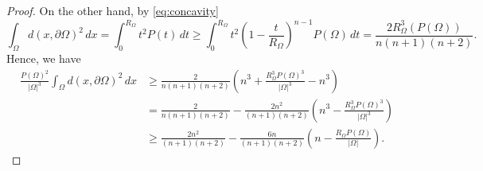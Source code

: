 \documentclass[10pt,a4paper]{amsart}
\newcommand{\abs}[1]{{\left|#1\right|}}
\begin{document}
\begin{proof}
On the other hand, by \eqref{eq:concavity}
$$\int_{\Omega} d(x,\partial\Omega)^2\, dx = \int_{0}^{R_\Omega} t^2 P(t)\, dt \geq \int_{0}^{R_\Omega} t^2 \left(1- \frac{t}{R_\Omega}\right)^{n-1}P(\Omega)\, dt = \frac{2R_{\Omega}^3(P(\Omega))}{n(n+1)(n+2)}.$$
Hence, we have
\begin{equation*}
\begin{aligned}
    \frac{P(\Omega)^2}{\abs{\Omega}^3}\int_{\Omega} d(x,\partial\Omega)^2\, dx &\geq \frac{2}{n(n+1)(n+2)} \left(n^3+\frac{R^3_{\Omega}P(\Omega)^3}{\abs{\Omega}^3}-n^3\right)\\
    &= \frac{2}{n(n+1)(n+2)} - \frac{2n^2}{(n+1)(n+2)}\left( n^3 -\frac{R^3_{\Omega}P(\Omega)^3}{\abs{\Omega}^3}\right)\\
    &\geq \frac{2n^2}{(n+1)(n+2)} - \frac{6n}{(n+1)(n+2)}\left( n-\frac{R_{\Omega}P(\Omega)}{\abs{\Omega}}\right).
    \end{aligned}
\end{equation*}
\end{proof}
\end{document}

